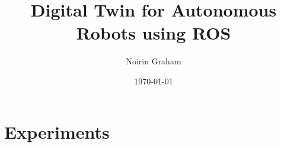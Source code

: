 \documentclass[11pt, english]{report}
\title{Digital Twin for Autonomous Robots using ROS}
\author{Noirin Graham}
\date{\today}
\begin{document}
\maketitle

\tableofcontents
\newpage

\listoffigures
\newpage

\listoftables
\newpage



% 

% 
% 

\printbibliography

\appendix
\chapter{Experiments}

\end{document}
